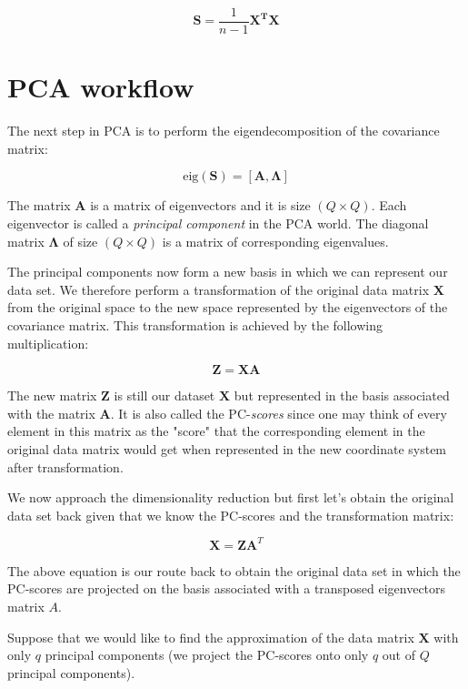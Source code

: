 \documentclass[10pt,twocolumn]{article}
\begin{document}
\begin{equation}
\bm{S} = \frac{1}{n-1} \bm{X^T} \bm{X}
\end{equation}


\section{PCA workflow}

The next step in PCA is to perform the eigendecomposition of the covariance matrix:

\begin{equation} \label{eq:eig-dec}
\text{eig}(\bm{S}) = [\bm{A}, \bm{\Lambda}]
\end{equation}

The matrix $\bm{A}$ is a matrix of eigenvectors and it is size $(Q \times Q)$. Each eigenvector is called a \textit{principal component} in the PCA world. The diagonal matrix $\bm{\Lambda}$ of size $(Q \times Q)$ is a matrix of corresponding eigenvalues.

The principal components now form a new basis in which we can represent our data set. We therefore perform a transformation of the original data matrix $\bm{X}$ from the original space to the new space represented by the eigenvectors of the covariance matrix. This transformation is achieved by the following multiplication:

\begin{equation}
\bm{Z} = \bm{X} \bm{A}
\end{equation}

The new matrix $\bm{Z}$ is still our dataset $\bm{X}$ but represented in the basis associated with the matrix $\bm{A}$. It is also called the PC-\textit{scores} since one may think of every element in this matrix as the "score" that the corresponding element in the original data matrix would get when represented in the new coordinate system after transformation.

We now approach the dimensionality reduction but first let's obtain the original data set back given that we know the PC-scores and the transformation matrix:

\begin{equation}
\bm{X} = \bm{Z} \bm{A}^T
\end{equation}

The above equation is our route back to obtain the original data set in which the PC-scores are projected on the basis associated with a transposed eigenvectors matrix $A$.

Suppose that we would like to find the approximation of the data matrix $\bm{X}$ with only $q$ principal components (we project the PC-scores onto only $q$ out of $Q$ principal components).
\end{document}
